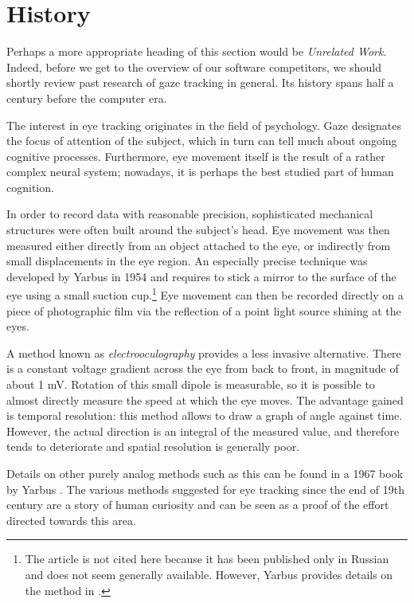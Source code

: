 \section{History}

Perhaps a more appropriate heading of this section would be \textit{Unrelated Work}.
Indeed, before we get to the overview of our software competitors, we should shortly review past research of gaze tracking in general.
Its history spans half a century before the computer era.

The interest in eye tracking originates in the field of psychology.
Gaze designates the focus of attention of the subject, which in turn can tell much about ongoing cognitive processes.
Furthermore, eye movement itself is the result of a rather complex neural system; nowadays, it is perhaps the best studied part of human cognition.

In order to record data with reasonable precision, sophisticated mechanical structures were often built around the subject's head.
Eye movement was then measured either directly from an object attached to the eye, or indirectly from small displacements in the eye region.
An especially precise technique was developed by Yarbus in 1954 and requires to stick a mirror to the surface of the eye using a small suction cup.\footnote{
The article is not cited here because it has been published only in Russian and does not seem generally available.
However, Yarbus provides details on the method in \cite{yarbus1967}.
}
Eye movement can then be recorded directly on a piece of photographic film via the reflection of a point light source shining at the eyes.

A method known as \textit{electrooculography} provides a less invasive alternative.
There is a constant voltage gradient across the eye from back to front, in magnitude of about 1 mV.
Rotation of this small dipole is measurable, so it is possible to almost directly measure the speed at which the eye moves.
The advantage gained is temporal resolution: this method allows to draw a graph of angle against time.
However, the actual direction is an integral of the measured value, and therefore tends to deteriorate and spatial resolution is generally poor.

Details on other purely analog methods such as this can be found in a 1967 book by Yarbus \cite{yarbus1967}.
The various methods suggested for eye tracking since the end of 19th century are a story of human curiosity and can be seen as a proof of the effort directed towards this area.

